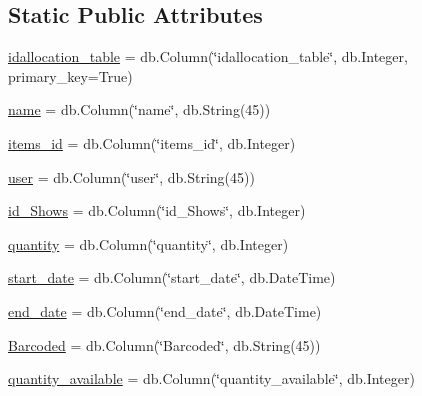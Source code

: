 \subsection*{Static Public Attributes}
\begin{DoxyCompactItemize}
\item 
\hyperlink{class_web_content_1_1classes_1_1allocation__table_aa3e71cab5ccef034cc859f9df77b83cb}{idallocation\+\_\+table} = db.\+Column(\char`\"{}idallocation\+\_\+table\char`\"{}, db.\+Integer, primary\+\_\+key=True)
\item 
\hyperlink{class_web_content_1_1classes_1_1allocation__table_a22afd1f2474fcb3a8add213aa82f08b9}{name} = db.\+Column(\char`\"{}name\char`\"{}, db.\+String(45))
\item 
\hyperlink{class_web_content_1_1classes_1_1allocation__table_ad98336114a772790e5c148f397de445c}{items\+\_\+id} = db.\+Column(\char`\"{}items\+\_\+id\char`\"{}, db.\+Integer)
\item 
\hyperlink{class_web_content_1_1classes_1_1allocation__table_a42be6ad06e7d48d95d6f792d42e44ff6}{user} = db.\+Column(\char`\"{}user\char`\"{}, db.\+String(45))
\item 
\hyperlink{class_web_content_1_1classes_1_1allocation__table_a2e89ec86c3716d18e305c9c259f86eca}{id\+\_\+\+Shows} = db.\+Column(\char`\"{}id\+\_\+\+Shows\char`\"{}, db.\+Integer)
\item 
\hyperlink{class_web_content_1_1classes_1_1allocation__table_a18854e8abdc8f618ce03cfbfbb0932e8}{quantity} = db.\+Column(\char`\"{}quantity\char`\"{}, db.\+Integer)
\item 
\hyperlink{class_web_content_1_1classes_1_1allocation__table_a5144b48dae04c952fa2a83701424dee5}{start\+\_\+date} = db.\+Column(\char`\"{}start\+\_\+date\char`\"{}, db.\+Date\+Time)
\item 
\hyperlink{class_web_content_1_1classes_1_1allocation__table_a7e1a1a4c7faa7f0af957407a80becd67}{end\+\_\+date} = db.\+Column(\char`\"{}end\+\_\+date\char`\"{}, db.\+Date\+Time)
\item 
\hyperlink{class_web_content_1_1classes_1_1allocation__table_a03a6731faa9d3420c8c018cdefbddbb8}{Barcoded} = db.\+Column(\char`\"{}Barcoded\char`\"{}, db.\+String(45))
\item 
\hyperlink{class_web_content_1_1classes_1_1allocation__table_a3f9c6c91b93e0802e156df425ba39eba}{quantity\+\_\+available} = db.\+Column(\char`\"{}quantity\+\_\+available\char`\"{}, db.\+Integer)
\end{DoxyCompactItemize}


